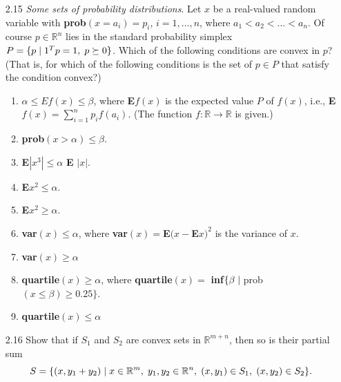 \documentclass[12pt, oneside]{article}%
\def\R{{\mathbb R}}
\begin{document}
\begin{enumerate}[font=\bfseries]
\vspace{5cm}

\item [2.15] \textit{Some sets of probability distributions}. Let $x$ be a real-valued random variable with \textbf{prob}$(x = a_i) = p_i$, $i = 1,\dots , n$, where $a_1 < a_2 < \dots < a_n$. Of course $p \in \R^n$ lies in the standard probability simplex $P = \{p \hspace{0.1cm}| \hspace{0.1cm} 1^T p = 1, \hspace{0.1cm} p \succeq 0\}$. Which of the following conditions are convex in $p$? (That is, for which of the following conditions is the set of $p \in P$ that satisfy the condition convex?)
\begin{enumerate}
    \item $\alpha \leq Ef(x) \leq \beta$, where \textbf{E}$f(x)$ is the expected value $P$ of $f(x)$, i.e., \textbf{E}$f(x) = \sum_{i=1}^n p_i f(a_i)$. (The function $f : \R \rightarrow \R$ is given.)
    \item \textbf{prob}$(x > \alpha) \leq \beta$.
    \item \textbf{E}$|x^3| \leq \alpha $ \textbf{E} $|x|$.
    \item \textbf{E}$x^2 \leq \alpha$.
    \item \textbf{E}$x^2 \geq \alpha$.
    \item \textbf{var}$(x) \leq \alpha$, where \textbf{var}$(x) = $\textbf{E}$(x-$\textbf{E}$x)^2$ is the variance of $x$.
    \item \textbf{var}$(x) \geq \alpha$
    \item \textbf{quartile}$(x)\geq \alpha$, where \textbf{quartile}$(x) = $\textbf{ inf}$\{\beta \hspace{0.1cm} | \hspace{0.1cm}$prob$(x \leq \beta) \geq 0.25\}$.
    \item \textbf{quartile}$(x) \leq \alpha$
\end{enumerate}

\vspace{5cm}

\item [2.16] Show that if $S_1$ and $S_2$ are convex sets in $\R^{m+n}$, then so is their partial sum
$$S = \{(x, y_1 + y_2) \hspace{0.1cm} | \hspace{0.1cm} x \in \R^m, \hspace{0.1cm} y_1, y_2 \in \R^n, \hspace{0.1cm}(x, y_1) \in S_1, \hspace{0.1cm}(x, y_2) \in S_2\}.$$


\end{enumerate}
\end{document}
